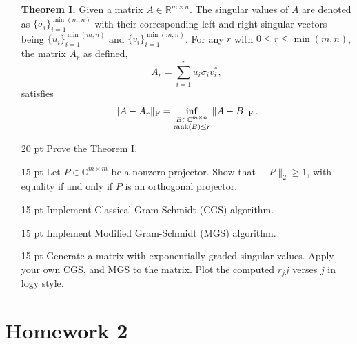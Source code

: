 \begin{enumerate}[label=\textbf{Problem \arabic*.}]
    \textbf{Theorem I.} Given a matrix \(A\in\mathbb{R}^{m\times n}\). The singular values of \(A\) are denoted as \(\{{\sigma}_{i}\}_{i=1}^{\min(m,n)}\) with their corresponding left and right singular vectors being \(\{u_{i}\}_{i=1}^{\min(m,n)}\) and \(\{v_{i}\}_{i=1}^{\min(m,n)}\). For any \(r\) with \(0\leq r\leq\min(m,n)\), the matrix \(A_{r}\) as defined,
    \[A_{r}=\sum_{i=1}^{r}u_{i}{\sigma}_{i}v_{i}^{*},\]
    satisfies
    \[\|A-A_{r}\|_{\mathrm{F}}=\inf_{\begin{subarray}{c}B\in\mathbb{C}^{m \times n}\\ \operatorname{rank}(B)\leq r\end{subarray}}\|A-B\|_{\mathrm{F}}\,.\]
    \item [20 pt] Prove the Theorem I.
    \item [15 pt] Let \(P\in\mathbb{C}^{m\times m}\) be a nonzero projector. Show that \(\|P\|_{2}\geq 1\), with equality if and only if \(P\) is an orthogonal projector.
    \item [15 pt] Implement Classical Gram-Schmidt (CGS) algorithm.
    \item [15 pt] Implement Modified Gram-Schmidt (MGS) algorithm.
    \item [15 pt] Generate a matrix with exponentially graded singular values. Apply your own CGS, and MGS to the matrix. Plot the computed \(r_{j}j\) verses \(j\) in logy style.
\end{enumerate}


\section{Homework 2}
